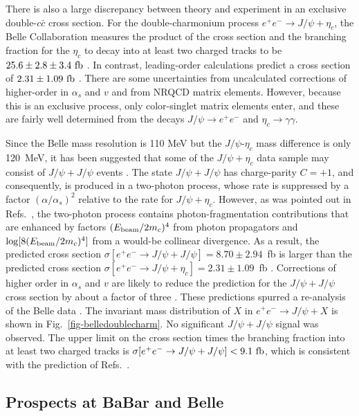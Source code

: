 There is also a large discrepancy between theory and experiment in an
exclusive double-$c \bar c$ cross section. For the double-charmonium
process $e^+e^-\to J/\psi+\eta_c$, the Belle Collaboration measures the
product of the cross section and the branching fraction for the $\eta_c$ to
decay into at least two charged tracks to be $25.6\pm
2.8\pm 3.4~\hbox{fb}$ \cite{Abe:2004ww}. In contrast, leading-order
calculations predict a cross section of $2.31\pm 1.09~\hbox{fb}$
\cite{Braaten:2002fi,Liu:2002wq, brodsky-ji-lee}. There are some
uncertainties from uncalculated corrections of higher-order in
$\alpha_s$ and $v$ and from NRQCD matrix elements. However, because this
is an exclusive process, only color-singlet matrix elements enter, and
these are fairly well determined from the decays $J/\psi\to e^+e^-$ and
$\eta_c\to \gamma\gamma$.

Since the Belle mass resolution is 110 MeV but the $J/\psi$-$\eta_c$
mass difference is only 120~MeV, it has been suggested that some of the
$J/\psi+\eta_c$ data sample may consist of $J/\psi+J/\psi$ events
\cite{Bodwin:2002fk,Bodwin:2002kk}. The state $J/\psi+J/\psi$ has
charge-parity $C=+1$, and consequently, is produced in a two-photon
process, whose rate is suppressed by a factor $(\alpha/\alpha_s)^2$
relative to the rate for $J/\psi+\eta_c$. However, as was pointed out in
Refs.~\cite{Bodwin:2002fk,Bodwin:2002kk}, the two-photon process
contains photon-fragmentation contributions that are enhanced by factors
$(E_{\rm beam}/2m_c)^4$ from photon propagators and $\log[8(E_{\rm
beam}/2m_c)^4]$ from a would-be collinear divergence. As a result, the
predicted cross section  $\sigma[e^+e^-\to J/\psi+J/\psi]=8.70\pm
2.94$~fb is larger than the predicted cross section $\sigma[e^+e^-\to
J/\psi+\eta_c]=2.31\pm 1.09$~fb \cite{Bodwin:2002fk,Bodwin:2002kk}.
Corrections of higher order in $\alpha_s$ and $v$ are likely to
reduce the prediction for the $J/\psi+J/\psi$ cross section by about a
factor of three \cite{Bodwin:2002kk,Luchinsky:2003yh}. These
predictions spurred a re-analysis of the Belle data \cite{Abe:2003ja}.
The invariant mass distribution of $X$ in $e^+e^-\to J/\psi+X$ is shown
in Fig.~\ref{fig-belledoublecharm}. No significant $J/\psi+J/\psi$
signal was observed. The upper limit on the cross section times the
branching fraction into at least two charged tracks \cite{Abe:2004ww} is
$\sigma[e^+e^-\to J/\psi+J/\psi]<9.1~\hbox{fb}$, which is consistent
with the prediction of Refs.~\cite{Bodwin:2002fk,Bodwin:2002kk}.

\subsection{Prospects at BaBar and Belle}

